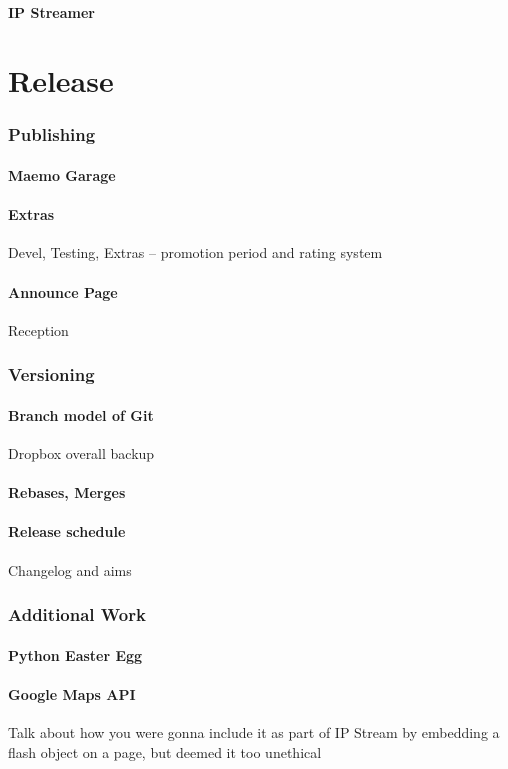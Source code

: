 \documentclass[11pt]{article} %
\begin{document}
\subsection{IP Streamer}

\part{Release}
\section{Publishing}
\subsection{Maemo Garage}
\subsection{Extras}{Devel, Testing, Extras -- promotion period and rating system}
\subsection{Announce Page}{Reception}

\section{Versioning}
\subsection{Branch model of Git}{Dropbox overall backup}
\subsection{Rebases, Merges}
\subsection{Release schedule}{Changelog and aims}

\section{Additional Work}
\subsection{Python Easter Egg}
\subsection{Google Maps API}{Talk about how you were gonna include it as part of IP Stream by embedding a flash object on a page, but deemed it too unethical}
\end{document}
